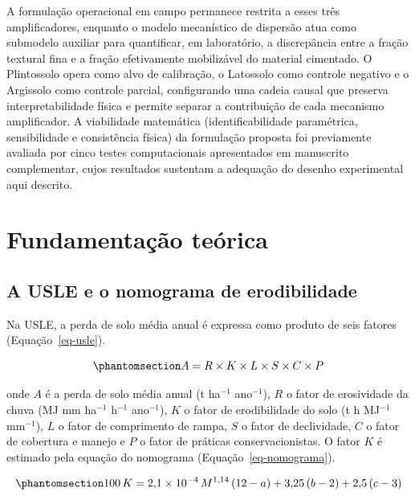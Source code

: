 \documentclass[
  brazilian,
  authoryear,
  preprint]{elsarticle}
\begin{document}
A formulação operacional em campo permanece restrita a esses três
amplificadores, enquanto o modelo mecanístico de dispersão atua como
submodelo auxiliar para quantificar, em laboratório, a discrepância
entre a fração textural fina e a fração efetivamente mobilizável do
material cimentado. O Plintossolo opera como alvo de calibração, o
Latossolo como controle negativo e o Argissolo como controle parcial,
configurando uma cadeia causal que preserva interpretabilidade física e
permite separar a contribuição de cada mecanismo amplificador. A
viabilidade matemática (identificabilidade paramétrica, sensibilidade e
consistência física) da formulação proposta foi previamente avaliada por
cinco testes computacionais apresentados em manuscrito complementar,
cujos resultados sustentam a adequação do desenho experimental aqui
descrito.

\section{Fundamentação teórica}\label{fundamentauxe7uxe3o-teuxf3rica}

\subsection{A USLE e o nomograma de
erodibilidade}\label{a-usle-e-o-nomograma-de-erodibilidade}

Na USLE, a perda de solo média anual é expressa como produto de seis
fatores (Equação~\ref{eq-usle}).

\begin{equation}\phantomsection\label{eq-usle}{
A = R \times K \times L \times S \times C \times P
}\end{equation}

onde \(A\) é a perda de solo média anual (t ha\(^{-1}\) ano\(^{-1}\)),
\(R\) o fator de erosividade da chuva (MJ mm ha\(^{-1}\) h\(^{-1}\)
ano\(^{-1}\)), \(K\) o fator de erodibilidade do solo (t h MJ\(^{-1}\)
mm\(^{-1}\)), \(L\) o fator de comprimento de rampa, \(S\) o fator de
declividade, \(C\) o fator de cobertura e manejo e \(P\) o fator de
práticas conservacionistas. O fator \(K\) é estimado pela equação do
nomograma (Equação~\ref{eq-nomograma}).

\begin{equation}\phantomsection\label{eq-nomograma}{
100\,K = 2{,}1 \times 10^{-4}\,M^{1{,}14}\,(12 - a) + 3{,}25\,(b - 2) + 2{,}5\,(c - 3)
}\end{equation}
\end{document}
